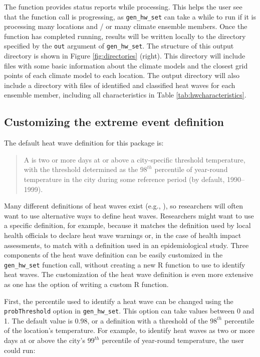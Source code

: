 \noindent The function provides status reports while processing. This
helps the user see that the function call is progressing, as
\texttt{gen\_hw\_set} can take a while to run if it is processing many
locations and / or many climate ensemble members. Once the function has
completed running, results will be written locally to the directory
specified by the \texttt{out} argument of \texttt{gen\_hw\_set}. The
structure of this output directory is shown in Figure
\ref{fig:directories} (right). This directory will include files with
some basic information about the climate models and the closest grid
points of each climate model to each location. The output directory will
also include a directory with files of identified and classified heat
waves for each ensemble member, including all characteristics in Table
\ref{tab:hwcharacteristics}.

\subsection{Customizing the extreme event
definition}\label{customizing-the-extreme-event-definition}

The default heat wave definition for this package is:

\begin{quote}
A  is two or more days at or above a city-specific
threshold temperature, with the threshold determined as the \(98^{th}\)
percentile of year-round temperature in the city during some reference
period (by default, 1990--1999).
\end{quote}

Many different definitions of heat waves exist (e.g.,
\citet{smith2013heat, kent2014heat}), so researchers will often want to
use alternative ways to define heat waves. Researchers might want to use
a specific definition, for example, because it matches the definition
used by local health officials to declare heat wave warnings or, in the
case of health impact assessments, to match with a definition used in an
epidemiological study. Three components of the heat wave definition can
be easily customized in the \texttt{gen\_hw\_set} function call, without
creating a new R function to use to identify heat waves. The
customization of the heat wave definition is even more extensive as one
has the option of writing a custom R function.

First, the percentile used to identify a heat wave can be changed using
the \texttt{probThreshold} option in \texttt{gen\_hw\_set}. This option
can take values between 0 and 1. The default value is 0.98, or a
definition with a threshold of the \(98^{th}\) percentile of the
location's temperature. For example, to identify heat waves as two or
more days at or above the city's \(99^{th}\) percentile of year-round
temperature, the user could run:

